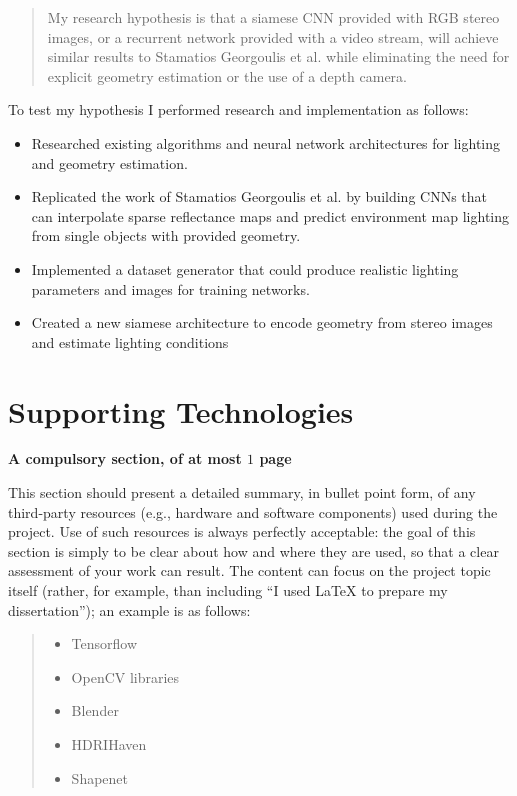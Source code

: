 \documentclass[ %
                    author={Gavin Parker},
                supervisor={Dr. Neill Campbell},
                    degree={MEng},
                     title={Deep Siamese Networks for Illumination Estimation from Stereo Images},
                  subtitle={},
                      type={research},
                      year={2018} ]{dissertation}
\begin{document}
\begin{quote}
My research hypothesis is that a siamese CNN provided with RGB stereo images, or a recurrent network provided with a video stream, will achieve similar results to Stamatios Georgoulis et al. while eliminating the need for explicit geometry estimation or the use of a depth camera.
\end{quote}

To test my hypothesis I performed research and implementation as follows:

\noindent
\begin{itemize}
\item Researched existing algorithms and neural network architectures for lighting and geometry estimation.
\item Replicated the work of Stamatios Georgoulis et al. by building CNNs that can interpolate sparse reflectance maps and predict environment map lighting from single objects with provided geometry.
\item Implemented a dataset generator that could produce realistic lighting parameters and images for training networks.
\item Created a new siamese architecture to encode geometry from stereo images and estimate lighting conditions
\end{itemize}


\chapter*{Supporting Technologies}

{\bf A compulsory section, of at most $1$ page}
\vspace{1cm} 

\noindent
This section should present a detailed summary, in bullet point form, 
of any third-party resources (e.g., hardware and software components) 
used during the project.  Use of such resources is always perfectly 
acceptable: the goal of this section is simply to be clear about how
and where they are used, so that a clear assessment of your work can
result.  The content can focus on the project topic itself (rather,
for example, than including ``I used \mbox{\LaTeX} to prepare my 
dissertation''); an example is as follows:

\begin{quote}
\noindent
\begin{itemize}
\item Tensorflow
\item OpenCV libraries
\item Blender
\item HDRIHaven
\item Shapenet
\end{itemize}
\end{quote}
\end{document}
